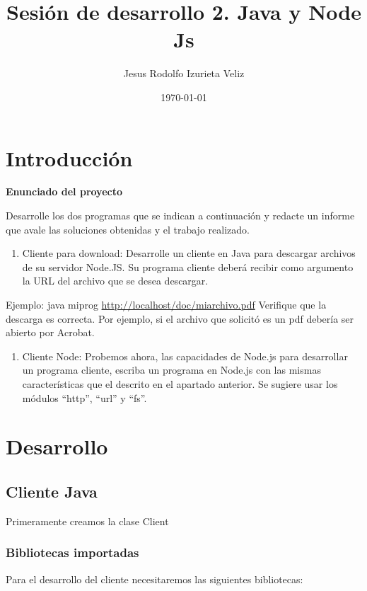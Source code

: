 \documentclass[11pt]{article}
\author{Jesus Rodolfo Izurieta Veliz}
\date{\today}
\title{Sesión de desarrollo 2. Java y Node Js}
\begin{document}
\maketitle
\tableofcontents

\pagebreak

\section{Introducción}
\label{sec:org55eeeb3}
\textbf{Enunciado del proyecto}

Desarrolle los dos programas que se indican a continuación y redacte un informe que avale las soluciones obtenidas y el trabajo realizado.

\begin{enumerate}
\item Cliente para download: Desarrolle un cliente en Java para descargar archivos de su servidor Node.JS. Su programa cliente deberá recibir como argumento la URL del archivo que se desea descargar.
\end{enumerate}
Ejemplo: java miprog \url{http://localhost/doc/miarchivo.pdf}
Verifique que la descarga es correcta. Por ejemplo, si el archivo que solicitó es un pdf debería ser abierto por Acrobat.

\begin{enumerate}
\item Cliente Node: Probemos ahora, las capacidades de Node.js para desarrollar un programa cliente, escriba un programa en Node.js con las mismas características que el descrito en el apartado anterior. Se sugiere usar los módulos “http”, “url” y “fs”.
\end{enumerate}

\section{Desarrollo}
\label{sec:org4ec9327}

\subsection{Cliente Java}
\label{sec:org9a52494}
Primeramente creamos la clase Client
\subsubsection{Bibliotecas importadas}
\label{sec:org003172d}
Para el desarrollo del cliente necesitaremos las siguientes bibliotecas:
\end{document}
